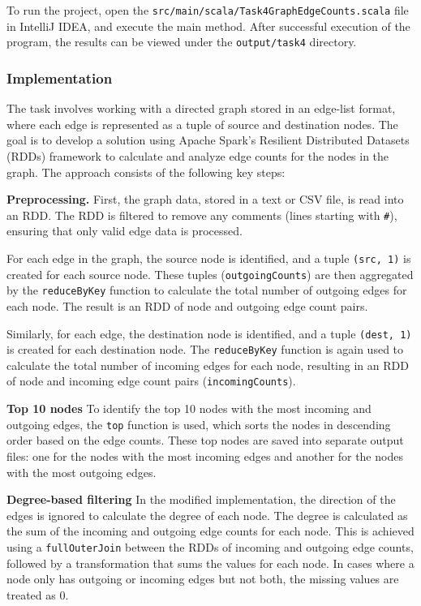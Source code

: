 \documentclass[acmlarge]{acmart}
\begin{document}
  To run the project, open the \texttt{src/main/scala/Task4GraphEdgeCounts.scala} file in IntelliJ IDEA, and execute the main method. After successful execution of the program, the results can be viewed under the \texttt{output/task4} directory.


  \subsubsection{Implementation}
  The task involves working with a directed graph stored in an edge-list format, where each edge is represented as a tuple of source and destination nodes. The goal is to develop a solution using Apache Spark's Resilient Distributed Datasets (RDDs) framework to calculate and analyze edge counts for the nodes in the graph. The approach consists of the following key steps:

  \textbf{Preprocessing.}
  First, the graph data, stored in a text or CSV file, is read into an RDD. The RDD is filtered to remove any comments (lines starting with \texttt{\#}), ensuring that only valid edge data is processed.

  For each edge in the graph, the source node is identified, and a tuple \texttt{(src, 1)} is created for each source node. These tuples (\texttt{outgoingCounts}) are then aggregated by the \texttt{reduceByKey} function to calculate the total number of outgoing edges for each node. The result is an RDD of node and outgoing edge count pairs.

  Similarly, for each edge, the destination node is identified, and a tuple \texttt{(dest, 1)} is created for each destination node. The \texttt{reduceByKey} function is again used to calculate the total number of incoming edges for each node,    resulting in an RDD of node and incoming edge count pairs (\texttt{incomingCounts}).

  \textbf{Top 10 nodes}
  To identify the top 10 nodes with the most incoming and outgoing edges, the \texttt{top} function is used, which sorts the nodes in descending order based on the edge counts. These top nodes are saved into separate output files: one for the nodes with the most incoming edges and another for the nodes with the most outgoing edges.

  \textbf{Degree-based filtering}
  In the modified implementation, the direction of the edges is ignored to calculate the degree of each node. The degree is calculated as the sum of the incoming and outgoing edge counts for each node. This is achieved using a \texttt{fullOuterJoin} between the RDDs of incoming and outgoing edge counts, followed by a transformation that sums the values for each node. In cases where a node only has outgoing or incoming edges but not both, the missing values are treated as 0.
\end{document}
